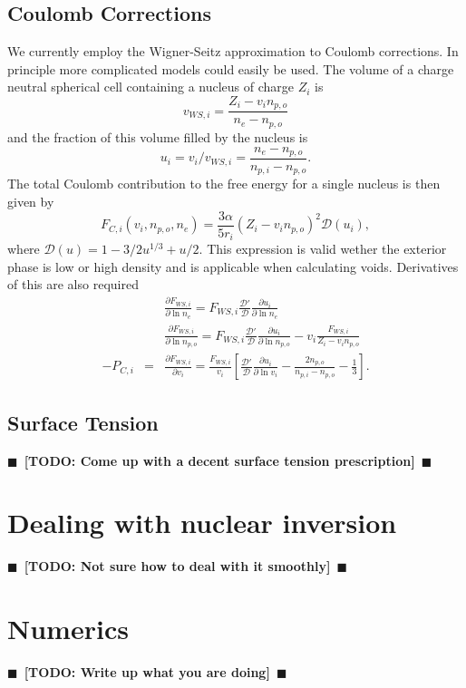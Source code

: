 \documentclass[11pt,letter]{article}
\newcommand{\pd}[2]{\frac{\partial #1}{\partial #2}}
\newcommand{\todo}[1]{{$\blacksquare$~\textbf{\color{blue}[TODO: #1]}}~$\blacksquare$}
\begin{document}
\subsection{Coulomb Corrections} 
We currently employ the Wigner-Seitz approximation to Coulomb corrections.  In
principle more complicated models could easily be used.  The volume of a charge
neutral spherical cell containing a nucleus of charge $Z_i$ is 
\begin{equation*} 
v_{WS,i} = \frac{Z_i - v_i n_{p,o}}{n_e - n_{p,o}}
\end{equation*}
and the fraction of this volume filled by the nucleus is 
\begin{equation*}
u_i = v_i/v_{WS,i} = \frac{n_e - n_{p,o}}{n_{p,i} - n_{p,o}}. 
\end{equation*} 
The total Coulomb contribution to the free energy for a single nucleus is then
given by
\begin{equation}
F_{C,i}(v_i, n_{p,o}, n_e) = \frac{3\alpha}{5 r_i} \left(Z_i - v_i n_{p,o}\right)^2 
\mathcal{D}(u_i),
\end{equation} 
where $\mathcal{D}(u) = 1 - 3/2 u^{1/3} + u/2$.  This expression is valid wether
the exterior phase is low or high density and is applicable when calculating
voids.  Derivatives of this are also required 
\begin{eqnarray*}
&& \pd{F_{WS,i}}{\ln n_e} = F_{WS,i} \frac{\mathcal{D}'}{\mathcal{D}}
\pd{u_i}{\ln n_e} \\
&& \pd{F_{WS,i}}{\ln n_{p,o}} = F_{WS,i} \frac{\mathcal{D}'}{\mathcal{D}}
\pd{u_i}{\ln n_{p,o}} - v_i \frac{F_{WS,i}}{Z_i - v_i n_{p,o}}\\
-P_{C,i} &=&  \pd{F_{WS,i}}{v_i} = \frac{F_{WS,i}}{v_i} 
\left[ \frac{\mathcal{D}'}{\mathcal{D}}  \pd{u_i}{\ln v_i} 
- \frac{2n_{p,o}}{n_{p,i} - n_{p,o}} - \frac{1}{3} \right].
\end{eqnarray*}
  
\subsection{Surface Tension}
\todo{Come up with a decent surface tension prescription}

\section{Dealing with nuclear inversion}
\todo{Not sure how to deal with it smoothly} 

\section{Numerics}
\todo{Write up what you are doing} 
\end{document}

